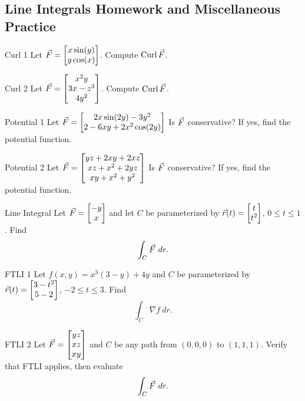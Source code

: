 \renewcommand\thesubsection{\thesection.\Alph{subsection}}
\setcounter{subsection}{17}
\subsection{Line Integrals Homework and Miscellaneous Practice}


\begin{exercise}{Curl 1}
Let $\vec{F}=\begin{bmatrix}x\sin(y)\\y\cos(x)\end{bmatrix}$. Compute $\operatorname{Curl}\vec{F}$.
\end{exercise}

\begin{pexercise}{Curl 2}
Let $\vec{F}=\begin{bmatrix}x^2y\\3x-z^3\\4y^2\end{bmatrix}$. Compute $\operatorname{Curl}\vec{F}$.
\end{pexercise}

\begin{exercise}{Potential 1}
Let $\vec{F}=\begin{bmatrix}2x\sin(2y)-3y^2\\2-6xy+2x^2\cos(2y)\end{bmatrix}$ Is $\vec{F}$ conservative? If yes, find the potential function.
\end{exercise}

\begin{exercise}{Potential 2}
Let $\vec{F}=\begin{bmatrix}yz+2xy+2xz\\xz+x^2+2yz\\xy+x^2+y^2\end{bmatrix}$ Is $\vec{F}$ conservative? If yes, find the potential function.
\end{exercise}

\begin{exercise}{Line Integral}
Let $\vec{F}=\begin{bmatrix}-y\\x\end{bmatrix}$ and let $C$ be parameterized by $\vec{r}(t)=\begin{bmatrix}t\\t^2\end{bmatrix}$, $0\leq t\leq 1$. Find $$\int_C \vec{F} \ dr. $$
\end{exercise}

\begin{pexercise}{FTLI 1}
Let $f(x,y)=x^3(3-y)+4y$ and $C$ be parameterized by $\vec{r}(t)=\begin{bmatrix}3-t^2\\5-2\end{bmatrix}$, $-2\leq t\leq 3$. Find $$\int_C \nabla f \ dr.$$
\end{pexercise}

\begin{exercise}{FTLI 2}
Let $\vec{F}=\begin{bmatrix}yz\\xz\\xy\end{bmatrix}$ and $C$ be any path from $(0,0,0)$ to $(1,1,1)$. Verify that FTLI applies, then evaluate $$\int_C \vec{F} \ dr. $$
\end{exercise}

